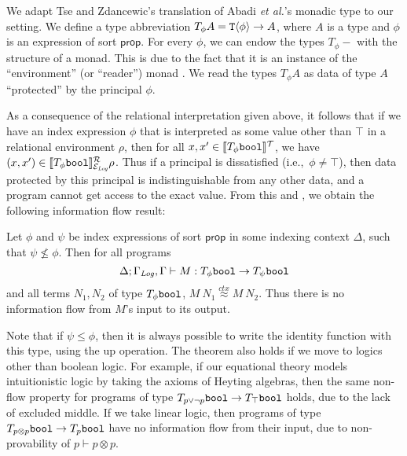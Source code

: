 We adapt Tse and Zdancewic's translation of Abadi \emph{et al.}'s monadic
type to our setting. We define a type abbreviation $T_\phi A =
\textup{\texttt{T}}\langle \phi \rangle \to A$, where $A$ is a type and $\phi$ is an
expression of sort $\mathsf{prop}$. For every $\phi$, we can endow the
types $T_\phi-$ with the structure of a monad. This is due to the fact
that it is an instance of the ``environment'' (or ``reader'') monad
\cite{jones95functional}. We read the types $T_\phi A$ as data of type
$A$ ``protected'' by the principal $\phi$.

As a consequence of the relational interpretation given above, it
follows that if we have an index expression $\phi$ that is interpreted
as some value other than $\top$ in a relational environment $\rho$,
then for all $x,x' \in \llbracket T_\phi\textup{\texttt{bool}} \rrbracket^{\mathcal{T}}$, we have $(x,x')
\in \llbracket T_\phi\textup{\texttt{bool}} \rrbracket^{\mathcal{R}}_{\mathcal{E}_{\mathit{Log}}}{\rho}$. Thus if
a principal is dissatisfied (i.e.,~$\phi \not= \top$), then data
protected by this principal is indistinguishable from any other
data, and a program cannot get access to the exact value. From this
and , we obtain the following information flow
result:

\begin{theorem}
  Let $\phi$ and $\psi$ be index expressions of sort $\mathsf{prop}$
  in some indexing context $\Delta$, such that $\psi \not\leq
  \phi$. Then for all programs
  \begin{displaymath}
    \Delta; \Gamma_{\mathit{Log}},\Gamma \vdash M : T_\phi\textup{\texttt{bool}} \to T_\psi\textup{\texttt{bool}}
  \end{displaymath}
  and all terms $N_1,N_2$ of type $T_\phi\textup{\texttt{bool}}$, $M\ N_1
  \stackrel{ctx}\approx M\ N_2$.  Thus there is no information flow
  from $M$'s input to its output.
\end{theorem}
Note that if $\psi \leq \phi$, then it is always possible to write the
identity function with this type, using the $\mathrm{up}$ operation.
The theorem also holds if we move to logics other than boolean
logic. For example, if our equational theory models intuitionistic
logic by taking the axioms of Heyting algebras, then the same non-flow
property for programs of type $T_{p\lor\lnot p}\textup{\texttt{bool}} \to
T_\top\textup{\texttt{bool}}$ holds, due to the lack of excluded middle. If
we take linear logic, then programs of type $T_{p\otimes
  p}\textup{\texttt{bool}} \to T_p\textup{\texttt{bool}}$ have no information flow
from their input, due to non-provability of $p \vdash p \otimes p$.


